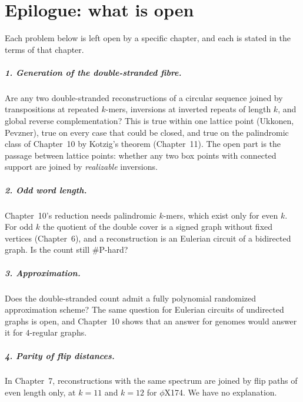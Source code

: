 \chapter*{Epilogue: what is open}

Each problem below is left open by a specific chapter, and each is stated in the terms of that
chapter.

\paragraph{1. Generation of the double-stranded fibre.} Are any two double-stranded reconstructions
of a circular sequence joined by transpositions at repeated $k$-mers, inversions at inverted repeats
of length $k$, and global reverse complementation? This is true within one lattice point (Ukkonen,
Pevzner), true on every case that could be closed, and true on the palindromic class of Chapter~10 by
Kotzig's theorem (Chapter~11). The open part is the passage between lattice points: whether any two box
points with connected support are joined by \emph{realizable} inversions.

\paragraph{2. Odd word length.} Chapter~10's reduction needs palindromic $k$-mers, which exist only for
even $k$. For odd $k$ the quotient of the double cover is a signed graph without fixed vertices
(Chapter~6), and a reconstruction is an Eulerian circuit of a bidirected graph. Is the count still
$\#$P-hard?

\paragraph{3. Approximation.} Does the double-stranded count admit a fully polynomial randomized
approximation scheme? The same question for Eulerian circuits of undirected graphs is open, and
Chapter~10 shows that an answer for genomes would answer it for $4$-regular graphs.

\paragraph{4. Parity of flip distances.} In Chapter~7, reconstructions with the same spectrum are joined
by flip paths of even length only, at $k=11$ and $k=12$ for $\phi$X174. We have no explanation.

